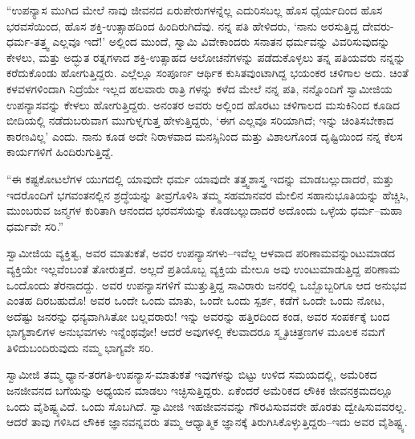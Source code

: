 “ಉಪನ್ಯಾಸ ಮುಗಿದ ಮೇಲೆ ನಾವು ಜೀವನದ ಏರುಪೇರುಗಳನ್ನೆಲ್ಲ ಎದುರಿಸಬಲ್ಲ ಹೊಸ ಧೈರ್ಯದಿಂದ ಹೊಸ ಭರವಸೆಯಿಂದ, ಹೊಸ ಶಕ್ತಿ-ಉತ್ಸಾಹದಿಂದ ಹಿಂದಿರುಗಿದೆವು. ನನ್ನ ಪತಿ ಹೇಳಿದರು, ‘ನಾನು ಅರಸುತ್ತಿದ್ದ ದೇವರು-ಧರ್ಮ-ತತ್ತ್ವ ಎಲ್ಲವೂ ಇದೆ!’ ಅಲ್ಲಿಂದ ಮುಂದೆ, ಸ್ವಾಮಿ ವಿವೇಕಾಂದರು ಸನಾತನ ಧರ್ಮವನ್ನು ವಿವರಿಸುವುದನ್ನು ಕೇಳಲು, ಮತ್ತು ಅದ್ಭುತ ರತ್ನಗಳಾದ ಶಕ್ತಿ-ಉತ್ಸಾಹದ ಆಲೋಚನೆಗಳನ್ನು ಪಡೆದುಕೊಳ್ಳಲು ತನ್ನ ಪತಿಯವರು ನನ್ನನ್ನು ಕರೆದುಕೊಂಡು ಹೋಗುತ್ತಿದ್ದರು. ಎಲ್ಲೆಲ್ಲೂ ಸಂಪೂರ್ಣ ಆರ್ಥಿಕ ಕುಸಿತವುಂಟಾಗಿದ್ದ ಭಯಂಕರ ಚಳಿಗಾಲ ಅದು. ಚಿಂತೆ ಕಳವಳಗಳಿಂದಾಗಿ ನಿದ್ರೆಯೇ ಇಲ್ಲದ ಹಲವಾರು ರಾತ್ರಿ ಗಳನ್ನು ಕಳೆದ ಮೇಲೆ ನನ್ನ ಪತಿ, ನನ್ನೊಂದಿಗೆ ಸ್ವಾಮೀಜಿಯ ಉಪನ್ಯಾಸವನ್ನು ಕೇಳಲು ಹೋಗುತ್ತಿದ್ದರು. ಅನಂತರ ಅವರು ಅಲ್ಲಿಂದ ಹೊರಟು ಚಳಿಗಾಲದ ಮಸುಕಿನಿಂದ ಕೂಡಿದ ಬೀದಿಯಲ್ಲಿ ನಡೆದುಬರುವಾಗ ಮುಗುಳ್ನಗುತ್ತ ಹೇಳುತ್ತಿದ್ದರು, ‘ಈಗ ಎಲ್ಲವೂ ಸರಿಯಾಗಿದೆ; ಇನ್ನು ಚಿಂತಿಸಬೇಕಾದ ಕಾರಣವಿಲ್ಲ’ ಎಂದು. ನಾನು ಕೂಡ ಅದೇ ನಿರಾಳವಾದ ಮನಸ್ಸಿನಿಂದ ಮತ್ತು ವಿಶಾಲಗೊಂಡ ದೃಷ್ಟಿಯಿಂದ ನನ್ನ ಕೆಲಸ ಕಾರ್ಯಗಳಿಗೆ ಹಿಂದಿರುಗುತ್ತಿದ್ದೆ.

“ಈ ಕಷ್ಟಕೋಟಲೆಗಳ ಯುಗದಲ್ಲಿ ಯಾವುದೇ ಧರ್ಮ ಯಾವುದೇ ತತ್ತ್ವಶಾಸ್ತ್ರ ಇದನ್ನು ಮಾಡಬಲ್ಲುದಾದರೆ, ಮತ್ತು ಇದರೊಂದಿಗೆ ಭಗವಂತನಲ್ಲಿನ ಶ್ರದ್ಧೆಯನ್ನು ತೀವ್ರಗೊಳಿಸಿ ತಮ್ಮ ಸಹಮಾನವರ ಮೇಲಿನ ಸಹಾನುಭೂತಿಯನ್ನು ಹೆಚ್ಚಿಸಿ, ಮುಂಬರುವ ಜನ್ಮಗಳ ಕುರಿತಾಗಿ ಆನಂದದ ಭರವಸೆಯನ್ನು ಕೊಡಬಲ್ಲುದಾದರೆ ಅದೊಂದು ಒಳ್ಳೆಯ ಧರ್ಮ–ಮಹಾ ಧರ್ಮವೇ ಸರಿ.”

ಸ್ವಾಮೀಜಿಯ ವ್ಯಕ್ತಿತ್ವ, ಅವರ ಮಾತುಕತೆ, ಅವರ ಉಪನ್ಯಾಸಗಳು–ಇವೆಲ್ಲ ಆಳವಾದ ಪರಿಣಾಮವನ್ನುಂಟುಮಾಡದ ವ್ಯಕ್ತಿಯೇ ಇಲ್ಲವೆಂಬಂತೆ ತೋರುತ್ತದೆ. ಅಲ್ಲದೆ ಪ್ರತಿಯೊಬ್ಬ ವ್ಯಕ್ತಿಯ ಮೇಲೂ ಅವು ಉಂಟುಮಾಡುತ್ತಿದ್ದ ಪರಿಣಾಮ ಒಂದೊಂದು ತೆರನಾದದ್ದು. ಅವರ ಉಪನ್ಯಾಸಗಳಿಗೆ ಮುತ್ತುತ್ತಿದ್ದ ಸಾವಿರಾರು ಜನರಲ್ಲಿ ಒಬ್ಬೊಬ್ಬರಿಗೂ ಆದ ಅನುಭವ ಎಂತಹ ದಿರಬಹುದೊ! ಅವರ ಒಂದೇ ಒಂದು ಮಾತು, ಒಂದೇ ಒಂದು ಸ್ಪರ್ಶ, ಕಡೆಗೆ ಒಂದೇ ಒಂದು ನೋಟ, ಅದೆಷ್ಟು ಜನರನ್ನು ಧನ್ಯವಾಗಿಸಿತೋ ಬಲ್ಲವರಾರು! ಇನ್ನು ಅವರನ್ನು ಹತ್ತಿರದಿಂದ ಕಂಡ, ಅವರ ಸಂಪರ್ಕಕ್ಕೆ ಬಂದ ಭಾಗ್ಯಶಾಲಿಗಳ ಅನುಭವಗಳು ಇನ್ನೆಂಥವೋ! ಆದರೆ ಅವುಗಳಲ್ಲಿ ಕೆಲವಾದರೂ ಸ್ಮೃತಿಚಿತ್ರಣಗಳ ಮೂಲಕ ನಮಗೆ ತಿಳಿದುಬಂದಿರುವುದು ನಮ್ಮ ಭಾಗ್ಯವೇ ಸರಿ.

ಸ್ವಾಮೀಜಿ ತಮ್ಮ ಧ್ಯಾನ-ತರಗತಿ-ಉಪನ್ಯಾಸ-ಮಾತುಕತೆ ಇವುಗಳನ್ನು ಬಿಟ್ಟು ಉಳಿದ ಸಮಯದಲ್ಲಿ, ಅಮೆರಿಕದ ಜನಜೀವನದ ಬಗೆಯನ್ನು ಅಧ್ಯಯನ ಮಾಡಲು ಇಚ್ಛಿಸುತ್ತಿದ್ದರು. ಏಕೆಂದರೆ ಅಮೆರಿಕದ ಲೌಕಿಕ ಜೀವನಕ್ರಮದಲ್ಲೂ ಒಂದು ವೈಶಿಷ್ಟ್ಯವಿದೆ. ಒಂದು ಸೊಬಗಿದೆ. ಸ್ವಾಮೀಜಿ ಇಹಜೀವನವನ್ನು ಗೌರವಿಸುವವರೇ ಹೊರತು ದ್ವೇಷಿಸುವವರಲ್ಲ. ಆದರೆ ತಾವು ಗಳಿಸಿದ ಲೌಕಿಕ ಜ್ಞಾನವನ್ನವರು ತಮ್ಮ ಆಧ್ಯಾತ್ಮಿಕ ಜ್ಞಾನಕ್ಕೆ ತಿರುಗಿಸಿಕೊಳ್ಳುತ್ತಿದ್ದರು–ಇದು ಅವರ ವೈಶಿಷ್ಟ್ಯ.

